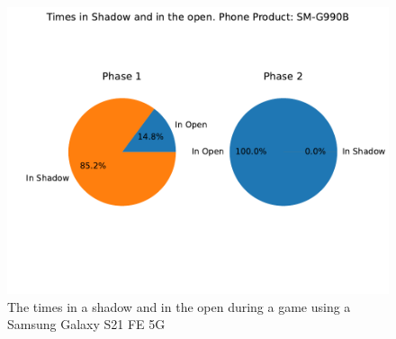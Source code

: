 \documentclass{l4proj}
\begin{document}
\begin{appendices}
\begin{figure}
    \includegraphics[width=0.8\linewidth]{images/SM-G990B_piechart.pdf}
    \caption{The times in a shadow and in the open during a game using a Samsung Galaxy S21 FE 5G}
    \label{fig:shadows21}
\end{figure}
\begin{figure}
    

\end{figure}
\end{appendices}
\end{document}
